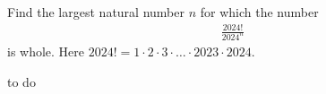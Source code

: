 Find the largest natural number $n$ for which the number 
\begin{align*}
\frac{2024!}{2024^{n}}
\end{align*}
is whole. Here $2024!=1 \cdot 2 \cdot 3 \cdot \ldots \cdot 2023 \cdot 2024$. 

\begin{answer}
to do
\end{answer}

